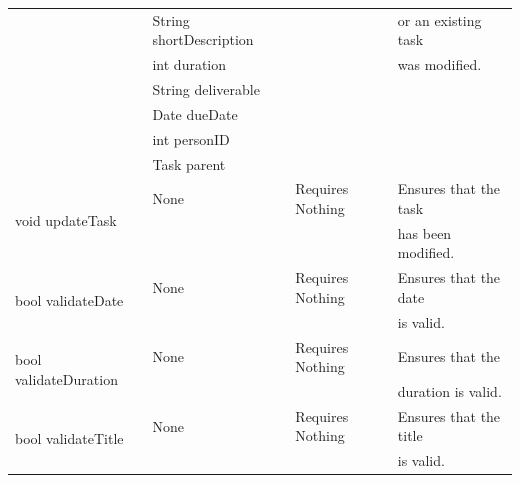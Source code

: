 \begin{tabular}{| l | l | l | l |}
                                                 & String shortDescription &                             & or an existing task\\
				 & int duration                   &                             & was modified.\\
				 & String deliverable          &                             &\\
		       		 & Date dueDate               &                             &\\
				 & int personID                  &                             &\\
				 & Task parent                   &                             &
\\
\hline
\multirow{2}{*}{void updateTask} & None & Requires Nothing & Ensures that the task\\
		                               &           &                             & has been modified.
\\
\hline
\multirow{2}{*}{bool validateDate} & None & Requires Nothing & Ensures that the date\\
		                                  &           &                            & is valid. 
\\
\hline
\multirow{2}{*}{bool validateDuration} & None & Requires Nothing & Ensures that the\\
		                                        &           &                            & duration is valid.
\\
\hline
\multirow{2}{*}{bool validateTitle} & None & Requires Nothing & Ensures that the title\\
		                                &           &                             & is valid.
\\
\hline
\end{tabular}

